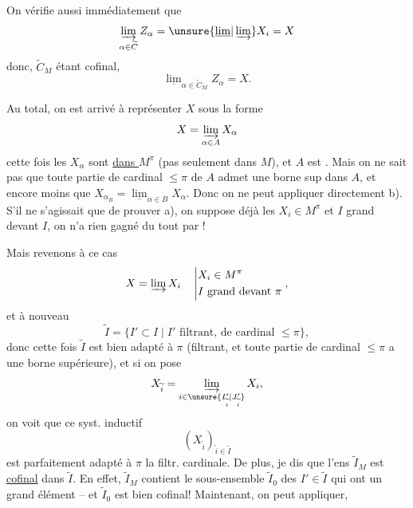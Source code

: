 On vérifie aussi immédiatement que
\[
\varinjlim_{\alpha\in\widetilde C}Z_\alpha=\unsure{\underline{\lim}|\varinjlim}X_i=X
\]
donc, $\widetilde C_M$ étant cofinal,
\[
\underline{\lim}_{\alpha\in\widetilde C_M}Z_\alpha=X.
\]

Au total, on est arrivé à représenter $X$ sous la forme
\[
X=\varinjlim_{\alpha\in A}X_\alpha
\]
cette fois les $X_\alpha$ sont \uline{dans $M^{\pi}$} (pas seulement dans $M$), et $A$ est  .  Mais on ne sait pas que  toute partie  de cardinal $\leq\pi$ de $A$ admet une borne sup  dans $A$, et encore moins que $X_{\alpha_B}=\underline{\lim}_{\alpha\in B}X_\alpha$. Donc on ne peut  appliquer directement b). S'il ne s'agissait que de prouver  a),  on suppose déjà les $X_i\in M^{\pi}$ et $I$ grand devant $I$, on n'a rien gagné du tout par  !

Mais revenons à ce cas
\[
X=\varinjlim X_i\quad\left|\begin{aligned}
&X_i\in M^{\pi}\\
&I\text{ grand devant }\pi
\end{aligned}\right.,
\]
et  à nouveau
\[
\widetilde I=\{I'\subset I\mid I'\text{ filtrant, de cardinal }\leq\pi\},
\]
donc cette fois $\widetilde I$ est  bien adapté à $\pi$ (filtrant, et toute partie  de cardinal $\leq\pi$ a une borne supérieure), et si on pose
\[
X_{\widetilde i}=\varinjlim_{i\in\unsure{I'_{\widetilde i}|J'_{\widetilde i}}}X_i,
\]
on voit que ce syst. inductif
\[
(X_{\widetilde i})_{\widetilde i\in\widetilde I}
\]
est parfaitement adapté à $\pi$  la filtr. cardinale. De plus, 
je dis que l'ens $\widetilde I_M$ est \uline{cofinal} dans $\widetilde I$. En effet,
$\widetilde I_M$ contient le sous-ensemble $\widetilde I_0$  des $I'\in\widetilde I$ qui ont un  grand élément -- et $\widetilde I_0$ est bien cofinal! Maintenant, on peut appliquer,

